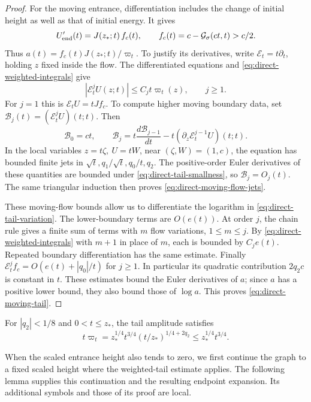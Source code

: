 \begin{proof}
For the moving entrance, differentiation includes the change of initial
height as well as that of initial energy. It gives
\[
 U_{\rm end}'(t)=J(z_*;t)\,f_c(t),\qquad
 f_c(t)=c-\mathcal G_\sigma(ct,t)>c/2.
\]
Thus \(a(t)=f_c(t)J(z_*;t)/\varpi_t\). To justify its derivatives,
write \(\mathcal E_t=t\partial_t\), holding \(z\) fixed inside the flow.
The differentiated equations and
\eqref{eq:direct-weighted-integrals} give
\begin{equation}
\label{eq:direct-moving-flow-jets}
 |\mathcal E_t^jU(z;t)|\le C_jt\varpi_t(z),\qquad j\ge1.
\end{equation}
For \(j=1\) this is \(\mathcal E_tU=tJf_c\). To compute higher moving
boundary data, set \(\mathcal B_j(t)=(\mathcal E_t^jU)(t;t)\). Then
\[
 \mathcal B_0=ct,\qquad
 \mathcal B_j=t\frac{d\mathcal B_{j-1}}{dt}
       -t(\partial_z\mathcal E_t^{j-1}U)(t;t).
\]
In the local variables \(z=t\zeta,\ U=tW\), near
\((\zeta,W)=(1,c)\), the equation has bounded finite jets in
\(\sqrt t,q_1/\sqrt t,q_0/t,q_2\). The positive-order Euler
derivatives of these quantities are bounded under
\eqref{eq:direct-tail-smallness}, so \(\mathcal B_j=O_j(t)\).
The same triangular induction then proves
\eqref{eq:direct-moving-flow-jets}.

These moving-flow bounds allow us to differentiate the logarithm in
\eqref{eq:direct-tail-variation}. The lower-boundary terms are
\(O(e(t))\). At order \(j\), the chain rule gives a finite sum
of terms with \(m\) flow variations, \(1\le m\le j\).
By \eqref{eq:direct-weighted-integrals} with \(m+1\) in place of
\(m\), each is bounded by \(C_je(t)\).
Repeated boundary differentiation has the same estimate.
Finally \(\mathcal E_t^jf_c=O(e(t)+|q_0|/t)\) for \(j\ge1\).
In particular its quadratic contribution \(2q_2c\) is constant
in \(t\). These estimates bound the Euler derivatives of \(a\); since
\(a\) has a positive lower bound, they also bound those of \(\log a\).
This proves \eqref{eq:direct-moving-tail}.
\end{proof}

For \(|q_2|<1/8\) and \(0<t\le z_*\), the tail amplitude satisfies
\begin{equation}
\label{eq:direct-tail-amplitude}
 t\varpi_t=z_*^{1/4}t^{3/4}(t/z_*)^{1/4+2q_2}\le z_*^{1/4}t^{3/4}.
\end{equation}

When the scaled entrance height also tends to zero, we first continue the
graph to a fixed scaled height where the weighted-tail estimate applies.
The following lemma supplies this continuation and the resulting endpoint
expansion. Its additional symbols and those of its proof are local.

